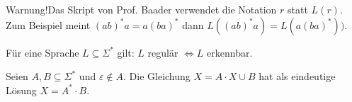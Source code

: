 Warnung!Das Skript von Prof. Baader verwendet die Notation $r$ statt $L(r)$.
Zum Beispiel meint $(ab)^\ast a=a(ba)^\ast$ dann $L((ab)^\ast a)=L(a(ba)^\ast))$.

\begin{satz}[Kleene]\label{satz5.5Kleene}\enter
	Für eine Sprache $L\subseteq\Sigma^\ast$ gilt: $L$ regulär $\Longleftrightarrow L$ erkennbar.
\end{satz}

\begin{lemma}[Arden]\label{lemma5.7Arden}\enter
	Seien $A,B\subseteq\Sigma^\ast$ und $\varepsilon\not\in A$.
	Die Gleichung $X=A\cdot X\cup B$ hat als eindeutige Lösung $X=A^\ast\cdot B$.
\end{lemma}
